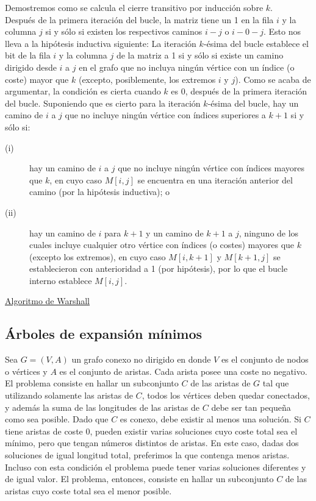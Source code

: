 Demostremos como se calcula el cierre transitivo por inducción sobre $k$.\\

Después de la primera iteración del bucle, la matriz tiene un 1 en la fila $i$ y la columna $j$ si y sólo si existen los respectivos caminos $i-j$ o $i-0-j$. Esto nos lleva a la hipótesis inductiva siguiente: La iteración $k$-ésima del bucle establece el bit de la fila $i$ y la columna $j$ de la matriz a 1 si y sólo si existe un camino dirigido desde $i$ a $j$ en el grafo que no incluya ningún vértice con un índice (o coste) mayor que $k$ (excepto, posiblemente, los extremos $i$ y $j$). Como se acaba de argumentar, la condición es cierta cuando $k$ es 0, después de la primera iteración del bucle. Suponiendo que es cierto para la iteración $k$-ésima del bucle, hay un camino de $i$ a $j$ que no incluye ningún vértice con índices superiores a $k+1$ si y sólo si:
\begin{description}
\item[(i)] hay un camino de $i$ a $j$ que no incluye ningún vértice con índices mayores que $k$, en cuyo caso $M[i,j]$ se encuentra en una iteración anterior del camino (por la hipótesis inductiva); o 
\item[(ii)] hay un camino de $i$ para $k+1$ y un camino de $k+1$ a $j$, ninguno de los cuales incluye cualquier otro vértice con índices (o costes) mayores que $k$ (excepto los extremos), en cuyo caso $M[i,k+1]$ y $M[k+1,j]$ se establecieron con anterioridad a 1 (por hipótesis), por lo que el bucle interno establece $M[i,j]$.
\end{description}

\underline{Algoritmo de Warshall}\\


\subsection{Árboles de expansión mínimos}

Sea $G = (V,A)$ un grafo conexo no dirigido en donde $V$ es el conjunto de nodos o vértices y $A$ es el conjunto de aristas. Cada arista posee una coste no negativo. El problema consiste en hallar un subconjunto $C$ de las aristas de $G$ tal que utilizando solamente las aristas de $C$, todos los vértices deben quedar conectados, y además la suma de las longitudes de las aristas de $C$ debe ser tan pequeña como sea posible. Dado que $C$ es conexo, debe existir al menos una solución. Si $C$ tiene aristas de coste 0, pueden existir varias soluciones cuyo coste total sea el mínimo, pero que tengan números distintos de aristas. En este caso, dadas dos soluciones de igual longitud total, preferimos la que contenga menos aristas. Incluso con esta condición el problema puede tener varias soluciones diferentes y de igual valor. El problema, entonces, consiste en hallar un subconjunto $C$ de las aristas cuyo coste total sea el menor posible.\\

